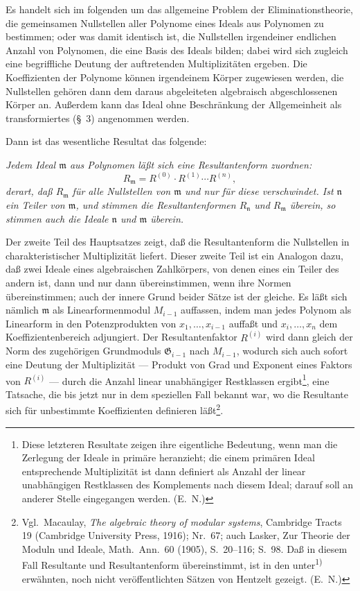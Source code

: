 \documentclass[fontsize=10pt,paper=a5,pagesize,headings=small]{scrbook}
\newcommand{\ideal}[1]{\mathfrak{#1}}
\theoremstyle{plain}
\begin{document}

\setcounter{page}{423}

Es handelt sich im folgenden um das allgemeine Problem der Eliminations\-theorie,
die gemeinsamen Nullstellen aller Polynome eines Ideals aus Polynomen zu bestimmen;
oder was damit identisch ist, die Nullstellen irgendeiner endlichen Anzahl von Polynomen,
die eine Basis des Ideals bilden; dabei wird sich zugleich eine begriffliche Deutung der
auftretenden Multiplizitäten ergeben. Die Koeffizienten der Polynome können irgendeinem
Körper zugewiesen werden, die Nullstellen gehören dann dem daraus abgeleiteten
algebraisch abgeschlossenen Körper an. Außerdem kann das Ideal ohne Beschränkung
der Allgemeinheit als transformiertes (\S~3) angenommen werden.

Dann ist das wesentliche Resultat das folgende:

\textit{Jedem Ideal $\ideal{m}$ aus Polynomen läßt sich eine Resultantenform zuordnen:
\[ R_{\ideal{m}} = R^{(0)} \cdot R^{(1)} \cdots R^{(n)}, \]
derart, daß $R_{\ideal{m}}$ für alle Nullstellen von $\ideal{m}$ und nur für diese verschwindet.
Ist $\ideal{n}$ ein Teiler von $\ideal{m}$, und stimmen die Resultantenformen $R_{\ideal{n}}$ und
$R_{\ideal{m}}$ überein, so stimmen auch die Ideale $\ideal{n}$ und $\ideal{m}$ überein.}

Der zweite Teil des Hauptsatzes zeigt, daß die Resultantenform die Nullstellen in
charakteristischer Multiplizität liefert. Dieser zweite Teil ist ein Analogon dazu, daß
zwei Ideale eines algebraischen Zahlkörpers, von denen eines ein Teiler des andern ist,
dann und nur dann übereinstimmen, wenn ihre Normen übereinstimmen; auch der innere
Grund beider Sätze ist der gleiche. Es läßt sich nämlich $\ideal{m}$ als Linearformenmodul
$M_{i-1}$ auffassen, indem man jedes Polynom als Linearform in den Potenzprodukten von
$x_1,\dots,x_{i-1}$ auffaßt und $x_i,\dots,x_n$ dem Koeffizientenbereich adjungiert. Der
Resultantenfaktor $R^{(i)}$ wird dann gleich der Norm des zugehörigen Grundmoduls
$\mathfrak{G}_{i-1}$ nach $M_{i-1}$, wodurch sich auch sofort eine Deutung der Multiplizität ---
Produkt von Grad und Exponent eines Faktors von $R^{(i)}$ --- durch die Anzahl linear
unabhängiger Restklassen ergibt\footnote{Diese letzteren Resultate zeigen ihre eigentliche
Bedeutung, wenn man die Zerlegung der Ideale in primäre heranzieht; die einem primären
Ideal entsprechende Multiplizität ist dann definiert als Anzahl der linear unabhängigen
Restklassen des Komplements nach diesem Ideal; darauf soll an anderer Stelle eingegangen
werden. (E.~N.)}, eine Tatsache, die bis jetzt nur in dem speziellen Fall bekannt war,
wo die Resultante sich für unbestimmte Koeffizienten definieren läßt\footnote{Vgl.\ Macaulay,
\textit{The algebraic theory of modular systems}, Cambridge Tracts 19 (Cambridge University
Press, 1916); Nr.~67; auch Lasker, Zur Theorie der Moduln und Ideale, Math.\ Ann.\ 60
(1905), S.~20--116; S.~98. Daß in diesem Fall Resultante und Resultantenform übereinstimmt,
ist in den unter\textsuperscript{1)} erwähnten, noch nicht veröffentlichten Sätzen von Hentzelt gezeigt.
(E.~N.)}.
\end{document}
